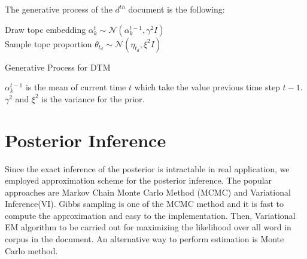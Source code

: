 The generative process of the $ d^{th} $ document is the following:\\
\begin{algorithm}[H]
Draw topc embedding $ \alpha_k^t\sim\mathcal{N}(\alpha_k^{t-1},\gamma^2I) $\\
Sample topc proportion $ \theta_{t_d}\sim\mathcal{N}(\eta_{t_d},\xi^2I) $\\
\caption{Generative Process for DTM}
\label{algorithm:dtm}
\end{algorithm}
$\alpha_k^{t-1}$ is the mean of current time $ t $ which take the value previous time step $ t-1 $.
$ \gamma^2 $ and $ \xi^2 $ is the variance for the prior.
\section{Posterior Inference}\label{ch4:1}
Since the exact inference of the posterior is intractable in real application, we employed approximation scheme for the posterior inference. The popular approaches are Markov Chain Monte Carlo Method (MCMC) and Variational Inference(VI)\cite{blei_variational_2006,hoffman_stochastic_2013}. Gibbs sampling is one of the MCMC method and it is fast to compute the approximation and easy to the implementation. Then, Variational EM algorithm to be carried out for maximizing the likelihood over all word in corpus in the document. An alternative way to perform estimation is Monte Carlo method.
